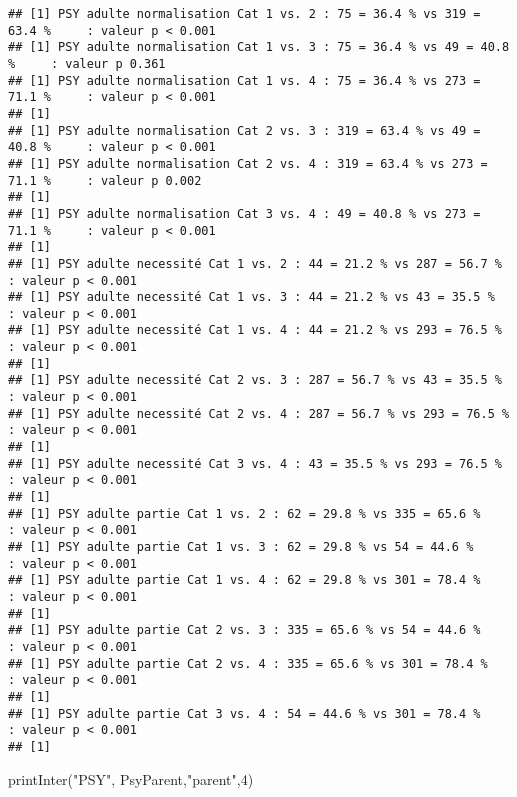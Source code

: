 \documentclass[
]{article}
\newenvironment{Shaded}{\begin{snugshade}}{\end{snugshade}}
\newcommand{\DecValTok}[1]{\textcolor[rgb]{0.00,0.00,0.81}{#1}}
\newcommand{\FunctionTok}[1]{\textcolor[rgb]{0.00,0.00,0.00}{#1}}
\newcommand{\NormalTok}[1]{#1}
\newcommand{\StringTok}[1]{\textcolor[rgb]{0.31,0.60,0.02}{#1}}
\begin{document}
\begin{verbatim}
## [1] PSY adulte normalisation Cat 1 vs. 2 : 75 = 36.4 % vs 319 = 63.4 %     : valeur p < 0.001
## [1] PSY adulte normalisation Cat 1 vs. 3 : 75 = 36.4 % vs 49 = 40.8 %     : valeur p 0.361
## [1] PSY adulte normalisation Cat 1 vs. 4 : 75 = 36.4 % vs 273 = 71.1 %     : valeur p < 0.001
## [1] 
## [1] PSY adulte normalisation Cat 2 vs. 3 : 319 = 63.4 % vs 49 = 40.8 %     : valeur p < 0.001
## [1] PSY adulte normalisation Cat 2 vs. 4 : 319 = 63.4 % vs 273 = 71.1 %     : valeur p 0.002
## [1] 
## [1] PSY adulte normalisation Cat 3 vs. 4 : 49 = 40.8 % vs 273 = 71.1 %     : valeur p < 0.001
## [1] 
## [1] PSY adulte necessité Cat 1 vs. 2 : 44 = 21.2 % vs 287 = 56.7 %     : valeur p < 0.001
## [1] PSY adulte necessité Cat 1 vs. 3 : 44 = 21.2 % vs 43 = 35.5 %     : valeur p < 0.001
## [1] PSY adulte necessité Cat 1 vs. 4 : 44 = 21.2 % vs 293 = 76.5 %     : valeur p < 0.001
## [1] 
## [1] PSY adulte necessité Cat 2 vs. 3 : 287 = 56.7 % vs 43 = 35.5 %     : valeur p < 0.001
## [1] PSY adulte necessité Cat 2 vs. 4 : 287 = 56.7 % vs 293 = 76.5 %     : valeur p < 0.001
## [1] 
## [1] PSY adulte necessité Cat 3 vs. 4 : 43 = 35.5 % vs 293 = 76.5 %     : valeur p < 0.001
## [1] 
## [1] PSY adulte partie Cat 1 vs. 2 : 62 = 29.8 % vs 335 = 65.6 %     : valeur p < 0.001
## [1] PSY adulte partie Cat 1 vs. 3 : 62 = 29.8 % vs 54 = 44.6 %     : valeur p < 0.001
## [1] PSY adulte partie Cat 1 vs. 4 : 62 = 29.8 % vs 301 = 78.4 %     : valeur p < 0.001
## [1] 
## [1] PSY adulte partie Cat 2 vs. 3 : 335 = 65.6 % vs 54 = 44.6 %     : valeur p < 0.001
## [1] PSY adulte partie Cat 2 vs. 4 : 335 = 65.6 % vs 301 = 78.4 %     : valeur p < 0.001
## [1] 
## [1] PSY adulte partie Cat 3 vs. 4 : 54 = 44.6 % vs 301 = 78.4 %     : valeur p < 0.001
## [1]
\end{verbatim}

\begin{Shaded}
\begin{Highlighting}[]
\FunctionTok{printInter}\NormalTok{(}\StringTok{"PSY"}\NormalTok{, PsyParent,}\StringTok{"parent"}\NormalTok{,}\DecValTok{4}\NormalTok{)}
\end{Highlighting}
\end{Shaded}
\end{document}
